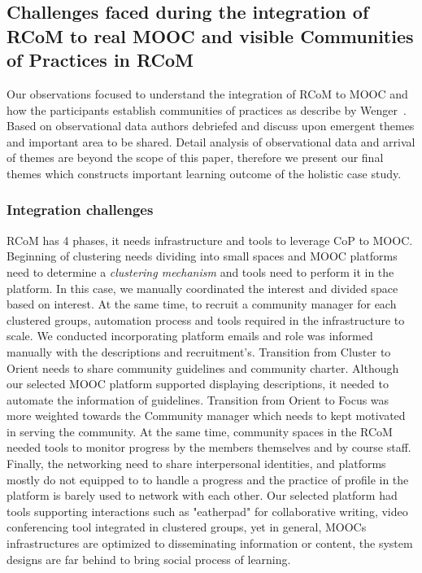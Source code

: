 \documentclass[format=acmsmall, review=false, screen=true]{acmart}
\begin{document}
\subsection{Challenges faced during the integration of RCoM to real MOOC and visible Communities of Practices in RCoM}

Our observations focused to understand the integration of RCoM to MOOC and how the participants establish communities of practices as describe by Wenger~\cite{wenger1999communities}. Based on observational data authors debriefed and discuss upon emergent themes and important area to be shared. Detail analysis of observational data and arrival of themes are beyond the scope of this paper, therefore we present our final themes which constructs important learning outcome of the holistic case study. 

\subsubsection{Integration challenges}
RCoM has 4 phases, it needs infrastructure and tools to leverage CoP to MOOC. Beginning of clustering needs dividing into small spaces and MOOC platforms need to determine a \textit{clustering mechanism} and tools need to perform it in the platform. In this case, we manually coordinated the interest and divided space based on interest. At the same time, to recruit a community manager for each clustered groups, automation process and tools required in the infrastructure to scale. We conducted incorporating platform emails and role was informed manually with the descriptions and recruitment's. Transition from Cluster to Orient needs to share community guidelines and community charter. Although our selected MOOC platform supported displaying descriptions, it needed to automate the information of guidelines. Transition from Orient to Focus was more weighted towards the Community manager which needs to kept motivated in serving the community. At the same time, community spaces in the RCoM needed tools to monitor progress by the members themselves and by course staff. Finally, the networking need to share interpersonal identities, and platforms mostly do not equipped to to handle a progress and the practice of profile in the platform is barely used to network with each other. Our selected platform had tools supporting interactions such as "eatherpad" for collaborative writing, video conferencing tool integrated in clustered groups, yet in general, MOOCs infrastructures are optimized to disseminating information or content, the system designs are far behind to bring social process of learning. 
\end{document}
